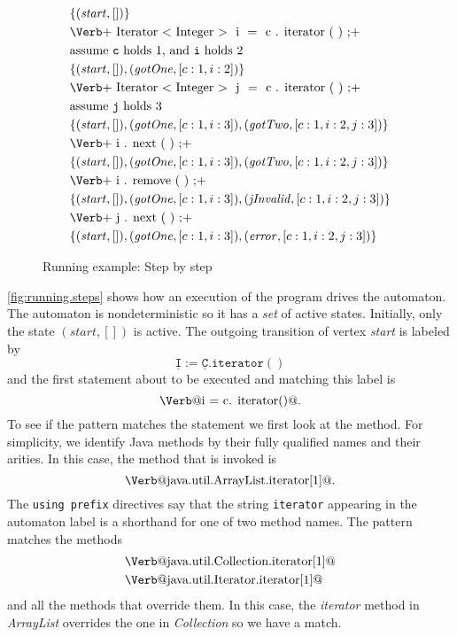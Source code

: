 \documentclass[preprint]{sigplanconf} %
\makeatletter
\newcommand{\verbline}[2][]{\[\text{\Verb@#2@}#1\]}
\newcommand{\pattern}[1]{\mathtt{\underline{#1}}}
\theoremstyle{definition}
\theoremstyle{remark}
\makeatother
\begin{document}
\begin{figure}
\begin{align*}
&\{(\mathit{start}, [])\} \\
&\text{\Verb+\PY{n}{Iterator}\PY{o}{<}\PY{n}{Integer}\PY{o}{>} \PY{n}{i} \PY{o}{=} \PY{n}{c}\PY{o}{.}\PY{n+na}{iterator}\PY{o}{(}\PY{o}{)}\PY{o}{;}+} \\
&\text{assume {\tt c} holds $1$, and {\tt i} holds $2$ } \\
&\{(\mathit{start},[]), (\mathit{gotOne},[c:1, i:2])\} \\
&\text{\Verb+\PY{n}{Iterator}\PY{o}{<}\PY{n}{Integer}\PY{o}{>} \PY{n}{j} \PY{o}{=} \PY{n}{c}\PY{o}{.}\PY{n+na}{iterator}\PY{o}{(}\PY{o}{)}\PY{o}{;}+}\\
&\text{assume {\tt j} holds $3$} \\
&\{(\mathit{start},[]), (\mathit{gotOne},[c:1,i:3]),(\mathit{gotTwo},[c:1,i:2,j:3])\} \\
&\text{\Verb+\PY{n}{i}\PY{o}{.}\PY{n+na}{next}\PY{o}{(}\PY{o}{)}\PY{o}{;}+} \\
&\{(\mathit{start},[]), (\mathit{gotOne},[c:1,i:3]),(\mathit{gotTwo},[c:1,i:2,j:3])\}\\
&\text{\Verb+\PY{n}{i}\PY{o}{.}\PY{n+na}{remove}\PY{o}{(}\PY{o}{)}\PY{o}{;}+} \\
&\{(\mathit{start},[]), (\mathit{gotOne},[c:1,i:3]),(\mathit{jInvalid},[c:1,i:2,j:3])\} \\
&\text{\Verb+\PY{n}{j}\PY{o}{.}\PY{n+na}{next}\PY{o}{(}\PY{o}{)}\PY{o}{;}+}\\
&\{(\mathit{start},[]), (\mathit{gotOne},[c:1,i:3]), (\mathit{error},[c:1,i:2,j:3])\}
\end{align*}
\caption{Running example: Step by step}
\label{fig:running.steps}
\end{figure} %

\autoref{fig:running.steps} shows how an execution of the program drives the automaton.
The automaton is nondeterministic so it has a \emph{set} of active states.
Initially, only the state $(\mathit{start},[])$ is active.
The outgoing transition of vertex \textit{start} is labeled by \[\pattern{I}:=\pattern{C}.\mathtt{iterator}()\] and the first statement  about to be executed and matching this label is \verbline[.]{i = c.\PY{n+na}{iterator}()}
To see if the pattern matches the statement we first look at the method.
For simplicity, we identify Java methods by their fully qualified names and their arities.
In this case, the method that is invoked is \verbline[.]{java.util.ArrayList.iterator[1]}
The \texttt{using prefix} directives say that the string \texttt{iterator} appearing in the automaton label is a shorthand for one of two method names.
The pattern matches the methods
\begin{align*}
&\text{\Verb@java.util.Collection.iterator[1]@} \\
&\text{\Verb@java.util.Iterator.iterator[1]@}
\end{align*}
and all the methods that override them.
In this case, the \textit{iterator} method in \textit{ArrayList} overrides the one in \textit{Collection} so we have a match.
\end{document}
